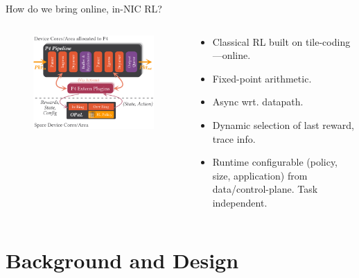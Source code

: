 \documentclass[aspectratio=169,xcolor={dvipsnames}
]{beamer}
\begin{document}
\begin{frame}{How do we bring online, in-NIC RL?}
	\begin{columns}
		\begin{column}{0.6\linewidth}
			\begin{figure}
				\includegraphics[width=\linewidth]{../paper/figures/arch-with-p4}
			\end{figure}
		\end{column}
		\begin{column}{0.4\linewidth}
			\begin{itemize}
				\item Classical RL built on tile-coding---\alert{online}.
				\item \alert{Fixed-point arithmetic}.
				\item Async wrt. datapath.
				\item Dynamic selection of last reward, trace info.
				\item \alert{Runtime configurable} (policy, size, application) from data/control-plane. \alert{Task independent.}
			\end{itemize}
		\end{column}
	\end{columns}
\end{frame}

\section{Background and Design}
\end{document}
